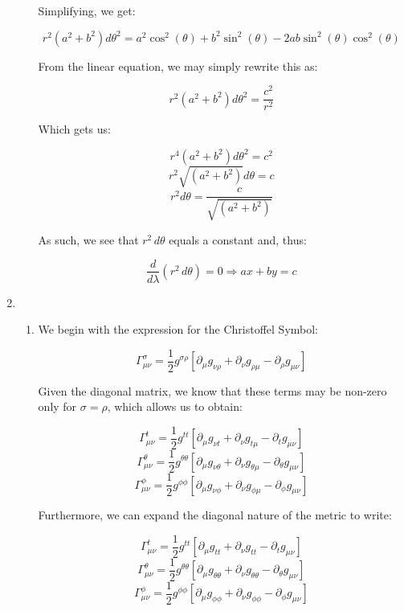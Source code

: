 \begin{enumerate}
\begin{enumerate}
        Simplifying, we get:

        $$r^2(a^2+b^2)d\theta^2=a^2\cos^2(\theta)+b^2\sin^2(\theta)-2ab\sin^2(\theta)\cos^2(\theta)$$

        From the linear equation, we may simply rewrite this as:

        $$r^2(a^2+b^2)d\theta^2=\frac{c^2}{r^2}$$

        Which gets us:

        $$r^4(a^2+b^2)d\theta^2=c^2$$
        $$r^2\sqrt{(a^2+b^2)}d\theta=c$$
        $$\boxed{r^2d\theta=\frac{c}{\sqrt{(a^2+b^2)}}}$$

        As such, we see that $r^2\,d\theta$ equals a constant and, thus:

        $$\frac{d}{d\lambda}(r^2\,d\theta)=0\Rightarrow ax+by=c$$

    \end{enumerate}

  \item

    \begin{enumerate}

      \item 

        We begin with the expression for the Christoffel Symbol:

          $$\Gamma^{\sigma}_{\mu\nu}=\frac{1}{2}g^{\sigma\rho}\left[ \partial_{\mu}g_{\nu\rho}+\partial_{\nu}g_{\rho\mu}-\partial_{\rho}g_{\mu\nu}  \right]$$

        Given the diagonal matrix, we know that these terms may be non-zero only for $\sigma=\rho$, which allows us to obtain:

          $$\Gamma^{t}_{\mu\nu}=\frac{1}{2}g^{tt}\left[ \partial_{\mu}g_{\nu t}+\partial_{\nu}g_{t\mu}-\partial_{t}g_{\mu\nu}  \right]$$
          $$\Gamma^{\theta}_{\mu\nu}=\frac{1}{2}g^{\theta\theta}\left[ \partial_{\mu}g_{\nu\theta}+\partial_{\nu}g_{\theta\mu}-\partial_{\theta}g_{\mu\nu}  \right]$$
          $$\Gamma^{\phi}_{\mu\nu}=\frac{1}{2}g^{\phi\phi}\left[ \partial_{\mu}g_{\nu\phi}+\partial_{\nu}g_{\phi\mu}-\partial_{\phi}g_{\mu\nu}  \right]$$

          Furthermore, we can expand the diagonal nature of the metric to write:

          $$\Gamma^{t}_{\mu\nu}=\frac{1}{2}g^{tt}\left[ \partial_{\mu}g_{tt}+\partial_{\nu}g_{tt}-\partial_{t}g_{\mu\nu}  \right]$$
          $$\Gamma^{\theta}_{\mu\nu}=\frac{1}{2}g^{\theta\theta}\left[ \partial_{\mu}g_{\theta\theta}+\partial_{\nu}g_{\theta\theta}-\partial_{\theta}g_{\mu\nu}  \right]$$
          $$\Gamma^{\phi}_{\mu\nu}=\frac{1}{2}g^{\phi\phi}\left[ \partial_{\mu}g_{\phi\phi}+\partial_{\nu}g_{\phi\phi}-\partial_{\phi}g_{\mu\nu}  \right]$$


\end{enumerate}
\end{enumerate}
